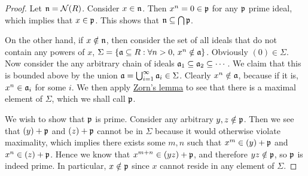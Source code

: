 \begin{proof}
    Let \(\mathfrak{n} = \operatorname{\mathcal{N}}(R)\).
    Consider \(x \in \mathfrak{n}\). Then \(x^n = 0 \in \mathfrak{p}\) for any \(\mathfrak{p}\) prime ideal,
    which implies that \(x \in \mathfrak{p}\).
    This shows that \(\mathfrak{n} \subseteq \bigcap \mathfrak{p}\).

    On the other hand, if \(x \notin \mathfrak{n}\),
    then consider the set of all ideals that do not contain any powers of \(x\),
    \(\Sigma = \{\mathfrak{a} \subseteq R: \forall n > 0,\, x^n \notin \mathfrak{a}\}\).
    Obviously \((0) \in \Sigma\).
    Now consider the any arbitrary chain of ideals \(\mathfrak{a}_1 \subseteq \mathfrak{a}_2 \subseteq \cdots\).
    We claim that this is bounded above by the union
    \(\mathfrak{a} = \bigcup_{i=1}^\infty \mathfrak{a}_i \in \Sigma\).
    Clearly \(x^n \notin \mathfrak{a}\), because if it is, \(x^n \in \mathfrak{a}_i\) for some \(i\).
    We then apply \hyperref[ax:zorn]{Zorn's lemma} to see that there is a maximal element of \(\Sigma\),
    which we shall call \(\mathfrak{p}\).

    We wish to show that \(\mathfrak{p}\) is prime.
    Consider any arbitrary \(y,z \notin \mathfrak{p}\).
    Then we see that \((y)+\mathfrak{p}\) and \((z)+\mathfrak{p}\) cannot be in \(\Sigma\)
    because it would otherwise violate maximality,
    which implies there exists some \(m,n\) such that \(x^m \in (y)+\mathfrak{p}\) and \(x^n \in (z)+\mathfrak{p}\).
    Hence we know that \(x^{m+n} \in (yz)+\mathfrak{p}\),
    and therefore \(yz \notin \mathfrak{p}\), so \(\mathfrak{p}\) is indeed prime.
    In particular, \(x \notin \mathfrak{p}\) since \(x\) cannot reside in any element of \(\Sigma\).
\end{proof}

